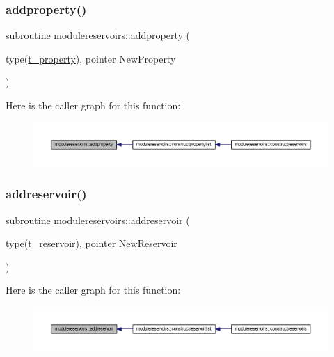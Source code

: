 \subsubsection{\texorpdfstring{addproperty()}{addproperty()}}
{\footnotesize\ttfamily subroutine modulereservoirs\+::addproperty (\begin{DoxyParamCaption}\item[{type(\mbox{\hyperlink{structmodulereservoirs_1_1t__property}{t\+\_\+property}}), pointer}]{New\+Property }\end{DoxyParamCaption})\hspace{0.3cm}{\ttfamily [private]}}

Here is the caller graph for this function\+:\nopagebreak
\begin{figure}[H]
\begin{center}
\leavevmode
\includegraphics[width=350pt]{namespacemodulereservoirs_a2452a1e02e4d13c0c920c8d181bf2e79_icgraph}
\end{center}
\end{figure}
\mbox{\label{namespacemodulereservoirs_aae6c3ff2990d073d614eb9e50d1658b9}} 
\subsubsection{\texorpdfstring{addreservoir()}{addreservoir()}}
{\footnotesize\ttfamily subroutine modulereservoirs\+::addreservoir (\begin{DoxyParamCaption}\item[{type(\mbox{\hyperlink{structmodulereservoirs_1_1t__reservoir}{t\+\_\+reservoir}}), pointer}]{New\+Reservoir }\end{DoxyParamCaption})\hspace{0.3cm}{\ttfamily [private]}}

Here is the caller graph for this function\+:\nopagebreak
\begin{figure}[H]
\begin{center}
\leavevmode
\includegraphics[width=350pt]{namespacemodulereservoirs_aae6c3ff2990d073d614eb9e50d1658b9_icgraph}
\end{center}
\end{figure}
\mbox{\label{namespacemodulereservoirs_a3bbdfd18a9b8de49cb39c9c2e60824f5}} 
